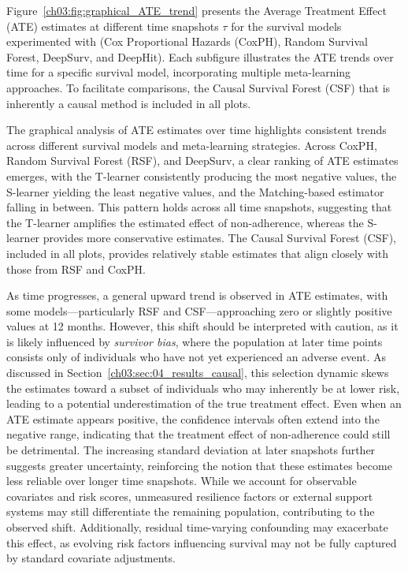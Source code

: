 Figure~\ref{ch03:fig:graphical_ATE_trend} presents the Average Treatment Effect (ATE) estimates at different time snapshots \(\tau\) for the survival models experimented with (Cox Proportional Hazards (CoxPH), Random Survival Forest, DeepSurv, and DeepHit).
Each subfigure illustrates the ATE trends over time for a specific survival model, incorporating multiple meta-learning approaches.
To facilitate comparisons, the Causal Survival Forest (CSF) that is inherently a causal method is included in all plots.





The graphical analysis of ATE estimates over time highlights consistent trends across different survival models and meta-learning strategies.
Across CoxPH, Random Survival Forest (RSF), and DeepSurv, a clear ranking of ATE estimates emerges, with the T-learner consistently producing the most negative values, the S-learner yielding the least negative values, and the Matching-based estimator falling in between.
This pattern holds across all time snapshots, suggesting that the T-learner amplifies the estimated effect of non-adherence, whereas the S-learner provides more conservative estimates.
The Causal Survival Forest (CSF), included in all plots, provides relatively stable estimates that align closely with those from RSF and CoxPH.

As time progresses, a general upward trend is observed in ATE estimates, with some models—particularly RSF and CSF—approaching zero or slightly positive values at 12 months.
However, this shift should be interpreted with caution, as it is likely influenced by \textit{survivor bias}, where the population at later time points consists only of individuals who have not yet experienced an adverse event.
As discussed in Section~\ref{ch03:sec:04_results_causal}, this selection dynamic skews the estimates toward a subset of individuals who may inherently be at lower risk, leading to a potential underestimation of the true treatment effect.
Even when an ATE estimate appears positive, the confidence intervals often extend into the negative range, indicating that the treatment effect of non-adherence could still be detrimental.
The increasing standard deviation at later snapshots further suggests greater uncertainty, reinforcing the notion that these estimates become less reliable over longer time snapshots.
While we account for observable covariates and risk scores, unmeasured resilience factors or external support systems may still differentiate the remaining population, contributing to the observed shift.
Additionally, residual time-varying confounding may exacerbate this effect, as evolving risk factors influencing survival may not be fully captured by standard covariate adjustments. 

